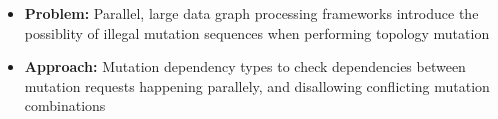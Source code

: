 \begin{frame}
\begin{itemize}
  \item \textbf{Problem:} Parallel, large data graph processing frameworks introduce the possiblity of illegal mutation sequences when performing topology mutation
  \newline
  \item \textbf{Approach:} Mutation dependency types to check dependencies between
  mutation requests happening parallely, and disallowing conflicting mutation combinations
\end{itemize}

\end{frame}